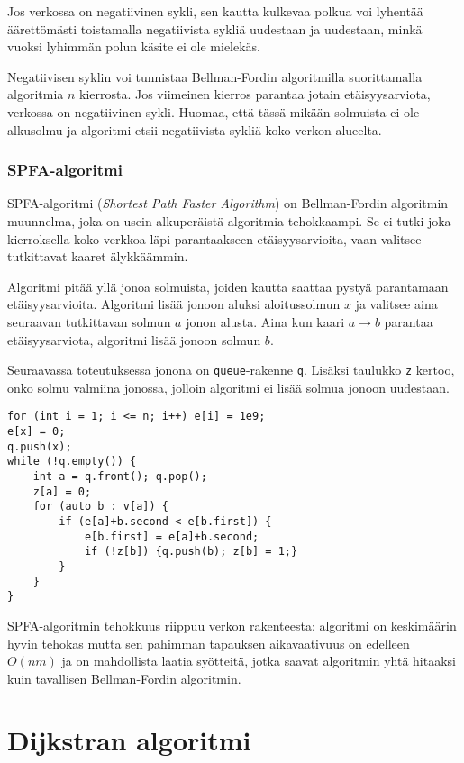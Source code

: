 Jos verkossa on negatiivinen sykli,
sen kautta kulkevaa polkua voi lyhentää äärettömästi
toistamalla negatiivista sykliä uudestaan ja uudestaan,
minkä vuoksi lyhimmän polun käsite ei ole mielekäs.

Negatiivisen syklin voi tunnistaa
Bellman-Fordin algoritmilla
suorittamalla algoritmia $n$ kierrosta.
Jos viimeinen kierros parantaa jotain
etäisyysarviota, verkossa on negatiivinen sykli.
Huomaa, että tässä mikään solmuista ei ole alkusolmu
ja algoritmi etsii negatiivista sykliä koko verkon alueelta.

\subsubsection{SPFA-algoritmi}

SPFA-algoritmi (\textit{Shortest Path Faster Algorithm})
on Bellman-Fordin algoritmin muunnelma,
joka on usein alkuperäistä algoritmia tehokkaampi.
Se ei tutki joka kierroksella koko verkkoa läpi
parantaakseen etäisyysarvioita, vaan valitsee
tutkittavat kaaret älykkäämmin.

Algoritmi pitää yllä jonoa solmuista,
joiden kautta saattaa pystyä parantamaan etäisyysarvioita.
Algoritmi lisää jonoon aluksi aloitussolmun $x$
ja valitsee aina seuraavan
tutkittavan solmun $a$ jonon alusta.
Aina kun kaari $a \rightarrow b$ parantaa
etäisyysarviota, algoritmi lisää jonoon solmun $b$.

Seuraavassa toteutuksessa jonona on \texttt{queue}-rakenne
\texttt{q}. Lisäksi taulukko \texttt{z} kertoo,
onko solmu valmiina jonossa, jolloin algoritmi ei
lisää solmua jonoon uudestaan.

\begin{lstlisting}
for (int i = 1; i <= n; i++) e[i] = 1e9;
e[x] = 0;
q.push(x);
while (!q.empty()) {
    int a = q.front(); q.pop();
    z[a] = 0;
    for (auto b : v[a]) {
        if (e[a]+b.second < e[b.first]) {
            e[b.first] = e[a]+b.second;
            if (!z[b]) {q.push(b); z[b] = 1;}
        }
    }
}
\end{lstlisting}

SPFA-algoritmin tehokkuus riippuu verkon rakenteesta:
algoritmi on keskimäärin hyvin tehokas mutta
sen pahimman tapauksen aikavaativuus on edelleen
$O(nm)$ ja on mahdollista
laatia syötteitä, jotka saavat algoritmin yhtä hitaaksi
kuin tavallisen Bellman-Fordin algoritmin.

\section{Dijkstran algoritmi}

